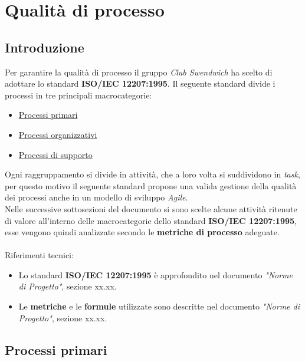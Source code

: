 \section{Qualità di processo}
\subsection{Introduzione}
Per garantire la qualità di processo il gruppo \textit{Club Swendwich} 
ha scelto di adottare lo standard \textbf{ISO/IEC 12207:1995}.
Il seguente standard divide i processi in tre principali macrocategorie:
\begin{itemize}
    \item \hyperref[sec:PCP]{Processi primari}
    \item \hyperref[sec:PCO]{Processi organizzativi}
    \item \hyperref[sec:PCS]{Processi di supporto}
\end{itemize}
Ogni raggruppamento si divide in attività, che a loro volta si suddividono
in \textit{task}, per questo motivo il seguente standard propone una valida gestione della
qualità dei processi anche in un modello di sviluppo \textit{Agile}.\\
\noindent
Nelle successive sottosezioni del documento si sono scelte alcune attività ritenute di valore all'interno
delle macrocategorie dello standard \textbf{ISO/IEC 12207:1995}, esse vengono quindi analizzate
secondo le \textbf{metriche di processo} adeguate.\\
\\
\noindent
Riferimenti tecnici:
\begin{itemize}
    \item Lo standard \textbf{ISO/IEC 12207:1995} è approfondito nel documento \textit{"Norme di Progetto"},
    sezione xx.xx.
    \item Le \textbf{metriche} e le \textbf{formule} utilizzate sono descritte nel documento \textit{"Norme di Progetto"},
    sezione xx.xx.
\end{itemize}

\bigskip

\subsection{Processi primari}
\label{sec:PCP}

